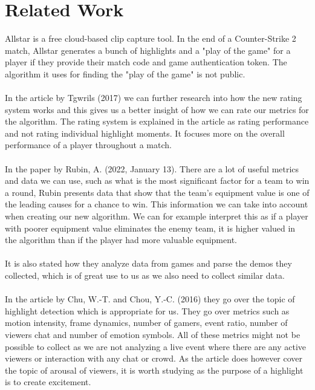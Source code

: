 \chapter{Related Work}
\label{chp:relatedwork}
Allstar is a free cloud-based clip capture tool. In the end of a Counter-Strike 2 match, Allstar generates a bunch of highlights and a "play of the game" for a player if they provide their match code and game authentication token. The algorithm it uses for finding the "play of the game" is not public. 
\\\\
In the article \cite{Tgwri1s2017} by Tgwrils (2017) we can further research into how the new rating system works and this gives us a better insight of how we can rate our metrics for the algorithm. The rating system is explained in the article as rating performance and not rating individual highlight moments. It focuses more on the overall performance of a player throughout a match. 
\\\\
In the paper \cite{Rubin2022} by Rubin, A. (2022, January 13). There are a lot of useful metrics and data we can use, such as what is the most significant factor for a team to win a round, Rubin presents data that show that the team's equipment value is one of the leading causes for a chance to win. This information we can take into account when creating our new algorithm. We can for example interpret this as if a player with poorer equipment value eliminates the enemy team, it is higher valued in the algorithm than if the player had more valuable equipment.\\\\ 
It is also stated how they analyze data from games and parse the demos they collected, which is of great use to us as we also need to collect similar data.\\\\
In the article \cite{Chu2016} by Chu, W.-T. and Chou, Y.-C. (2016) they go over the topic of highlight detection which is appropriate for us. They go over metrics such as motion intensity, frame dynamics, number of gamers, event ratio, number of viewers chat and number of emotion symbols. All of these metrics might not be possible to collect as we are not analyzing a live event where there are any active viewers or interaction with any chat or crowd. As the article does however cover the topic of arousal of viewers, it is worth studying as the purpose of a highlight is to create excitement.\\\\
